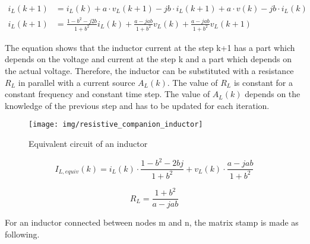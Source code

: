 \begin{align}
        i_L(k+1) &= i_L(k) + a \cdot v_L(k+1) - j b \cdot i_L(k+1) + a \cdot v(k) - j b \cdot i_L(k) \\
        i_L(k+1) &= \frac{1-b^2-j2b}{1+b^2}i_L(k) + \frac{a-jab}{1+b^2} v_L(k) + \frac{a-jab}{1+b^2} v_L(k+1)
\end{align}

The equation shows that the inductor current at the step k+1 has a part which depends on the voltage and current at the step k and a part which depends on the actual voltage. Therefore, the inductor can be substituted with a resistance $R_L$ in parallel with a current source $A_L(k)$. The value of $R_L$ is constant for a constant frequency and constant time step. The value of $A_L(k)$ depends on the knowledge of the previous step and has to be updated for each iteration.

\begin{figure}[ht]
	\centering
	\texttt{[image: img/resistive\_companion\_inductor]} 
	\caption{Equivalent circuit of an inductor}
	\label{fig:Inductor}
\end{figure}

 
\begin{equation} \label{eq:AL}
	I_{L,equiv}(k) = i_L(k) \cdot \frac{1-b^2-2bj}{1+b^2} + v_L(k) \cdot \frac{a-jab}{1+b^2}
\end{equation}

\begin{equation}
	R_L = \frac{1+b^2}{a-jab}
\end{equation}	

For an inductor connected between nodes m and n, the matrix stamp is made as following.

